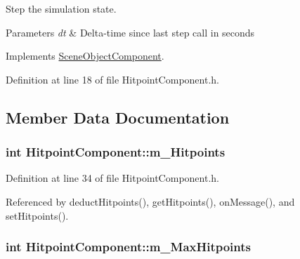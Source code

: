 Step the simulation state. 


\begin{DoxyParams}{Parameters}
{\em dt} & Delta-\/time since last step call in seconds \\
\hline
\end{DoxyParams}


Implements \hyperlink{class_scene_object_component_a99ebed011a6547be4d31a09927e3b810}{Scene\+Object\+Component}.



Definition at line 18 of file Hitpoint\+Component.\+h.



\subsection{Member Data Documentation}
\subsubsection[{\texorpdfstring{m\+\_\+\+Hitpoints}{m_Hitpoints}}]{\setlength{\rightskip}{0pt plus 5cm}int Hitpoint\+Component\+::m\+\_\+\+Hitpoints\hspace{0.3cm}{\ttfamily [private]}}\hypertarget{class_hitpoint_component_ae113cd6a7771b75ac8a22ae1b66cfeec}{}\label{class_hitpoint_component_ae113cd6a7771b75ac8a22ae1b66cfeec}


Definition at line 34 of file Hitpoint\+Component.\+h.



Referenced by deduct\+Hitpoints(), get\+Hitpoints(), on\+Message(), and set\+Hitpoints().

\subsubsection[{\texorpdfstring{m\+\_\+\+Max\+Hitpoints}{m_MaxHitpoints}}]{\setlength{\rightskip}{0pt plus 5cm}int Hitpoint\+Component\+::m\+\_\+\+Max\+Hitpoints\hspace{0.3cm}{\ttfamily [private]}}\hypertarget{class_hitpoint_component_a03ea97c4936474b35819c315fe2f65cb}{}\label{class_hitpoint_component_a03ea97c4936474b35819c315fe2f65cb}


